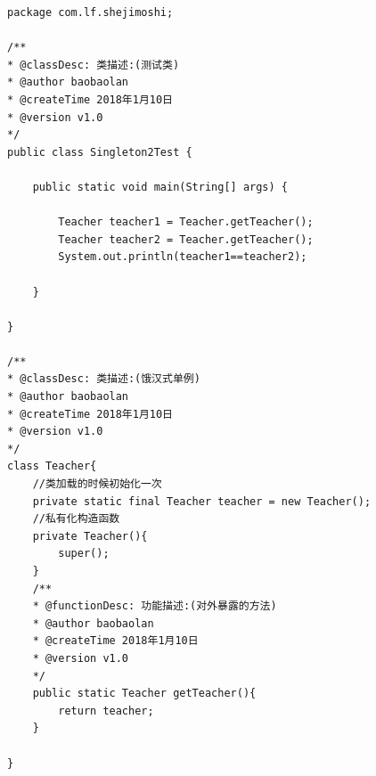 \begin{lstlisting}
package com.lf.shejimoshi;

/**
* @classDesc: 类描述:(测试类) 
* @author baobaolan
* @createTime 2018年1月10日  
* @version v1.0
*/
public class Singleton2Test {
	
	public static void main(String[] args) {
		
		Teacher teacher1 = Teacher.getTeacher();
		Teacher teacher2 = Teacher.getTeacher();
		System.out.println(teacher1==teacher2);
		
	}
	
}

/**
* @classDesc: 类描述:(饿汉式单例) 
* @author baobaolan
* @createTime 2018年1月10日  
* @version v1.0
*/
class Teacher{
	//类加载的时候初始化一次
	private static final Teacher teacher = new Teacher();
	//私有化构造函数
	private Teacher(){
		super();
	}
	/**
	* @functionDesc: 功能描述:(对外暴露的方法) 
	* @author baobaolan
	* @createTime 2018年1月10日  
	* @version v1.0
	*/
	public static Teacher getTeacher(){
		return teacher;
	}
	
}
\end{lstlisting}
